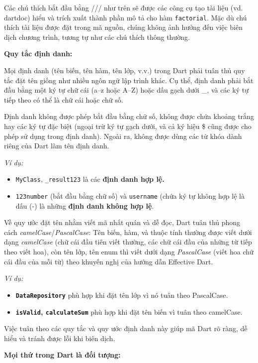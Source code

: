 \documentclass[../DoAn.tex]{subfiles}
\numberwithin{figure}{chapter}
\begin{document}
Các chú thích bắt đầu bằng /// như trên sẽ được các công cụ tạo tài liệu (vd. dartdoc) hiểu và trích xuất thành phần mô tả cho hàm \texttt{factorial}. Mặc dù chú thích tài liệu được đặt trong mã nguồn, chúng không ảnh hưởng đến việc biên dịch chương trình, tương tự như các chú thích thông thường.

\textbf{Quy tắc định danh:}

Mọi định danh (tên biến, tên hàm, tên lớp, v.v.) trong Dart phải tuân thủ quy tắc đặt tên giống như nhiều ngôn ngữ lập trình khác. Cụ thể, định danh phải bắt đầu bằng một ký tự chữ cái (a–z hoặc A–Z) hoặc dấu gạch dưới {\_}, và các ký tự tiếp theo có thể là chữ cái hoặc chữ số. 

Định danh không được phép bắt đầu bằng chữ số, không được chứa khoảng trắng hay các ký tự đặc biệt (ngoại trừ ký tự gạch dưới, và cả ký hiệu {\$} cũng được cho phép sử dụng trong định danh). Ngoài ra, không được dùng các từ khóa dành riêng của Dart làm tên định danh. 

\textit{Ví dụ:} 
\begin{itemize}
    \item \texttt{MyClass}, \texttt{{\_}result123} là các \textbf{định danh hợp lệ.} 
    \item \texttt{123number} (bắt đầu bằng chữ số) và \texttt{username} (chứa ký tự không hợp lệ là dấu (-) là những \textbf{định danh không hợp lệ}.
\end{itemize}

Về quy ước đặt tên nhằm viết mã nhất quán và dễ đọc, Dart tuân thủ phong cách \textit{camelCase}/\textit{PascalCase}: Tên biến, hàm, và thuộc tính thường được viết dưới dạng \textit{camelCase} (chữ cái đầu tiên viết thường, các chữ cái đầu của những từ tiếp theo viết hoa), còn tên lớp, tên enum thì viết dưới dạng \textit{PascalCase} (viết hoa chữ cái đầu của mỗi từ) theo khuyến nghị của hướng dẫn Effective Dart. 

\textit{Ví dụ:} 
\begin{itemize}
    \item \textbf{\texttt{DataRepository}} phù hợp khi đặt tên lớp vì nó tuân theo PascalCase. 
    \item \textbf{\texttt{isValid}, \texttt{calculateSum}} phù hợp khi đặt tên biến vì tuân theo camelCase.
\end{itemize}

Việc tuân theo các quy tắc và quy ước định danh này giúp mã Dart rõ ràng, dễ hiểu và tránh được lỗi khi biên dịch. 

\textbf{Mọi thứ trong Dart là đối tượng:} 
\end{document}
